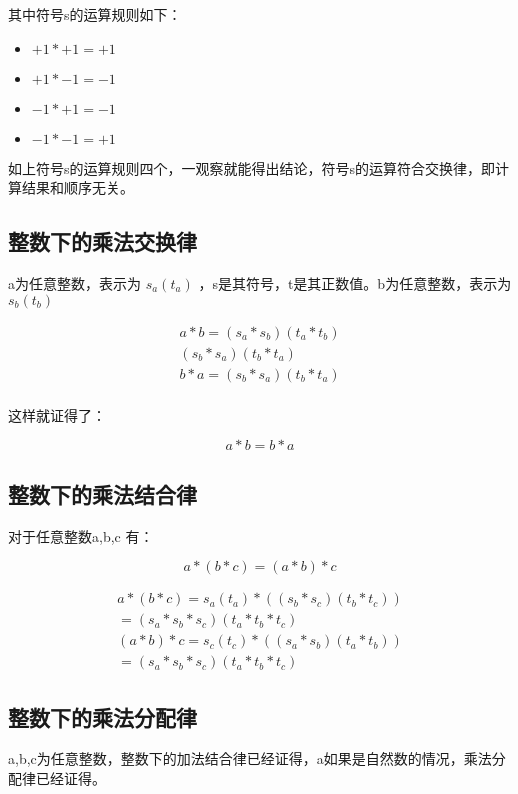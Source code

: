 \documentclass[12pt,oneside]{book}
\begin{document}
其中符号s的运算规则如下：

\begin{itemize}
\item $+1*+1 = +1$
\item $+1*-1 =-1$
\item $-1*+1 = -1$
\item $-1*-1 = +1$
\end{itemize}

如上符号s的运算规则四个，一观察就能得出结论，符号s的运算符合交换律，即计算结果和顺序无关。


\subsection{整数下的乘法交换律}
a为任意整数，表示为 $s_a(t_a)$ ，s是其符号，t是其正数值。b为任意整数，表示为 $s_b(t_b)$ 

\begin{align*}
a*b =  (s_a*s_b)(t_a*t_b)\\
(s_b*s_a)(t_b*t_a)\\
b*a =  (s_b*s_a)(t_b*t_a)\\
\end{align*}

这样就证得了：

\begin{equation}
a * b = b * a
\end{equation}


\subsection{整数下的乘法结合律}
对于任意整数a,b,c 有：

\begin{equation}
a * (b * c) = (a * b) * c
\end{equation}

\begin{align*}
a * (b * c) = s_a(t_a) * ((s_b*s_c)(t_b*t_c))\\
= (s_a*s_b*s_c)(t_a*t_b*t_c)\\
(a * b) * c = s_c(t_c) * ((s_a*s_b)(t_a*t_b))\\
= (s_a*s_b*s_c)(t_a*t_b*t_c)
\end{align*}


\subsection{整数下的乘法分配律}
a,b,c为任意整数，整数下的加法结合律已经证得，a如果是自然数的情况，乘法分配律已经证得。
\end{document}
